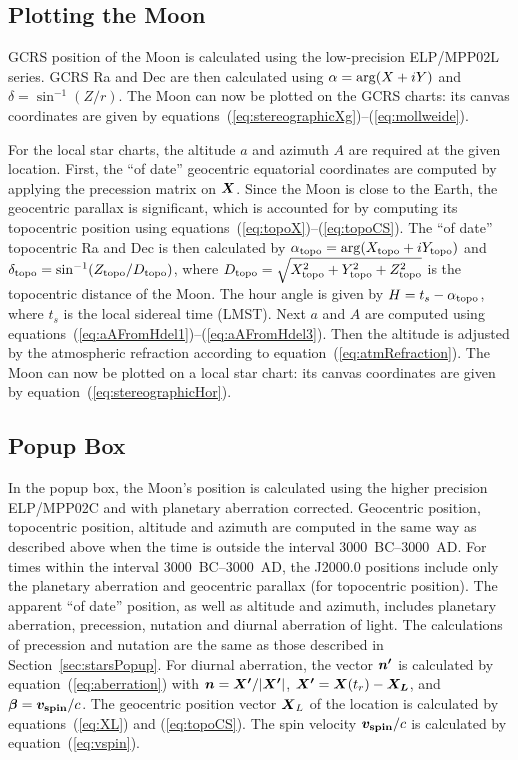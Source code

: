 \documentclass[12pt]{article}
\newcommand{\ve}[1]{\mbox{\boldmath $#1$}}
\begin{document}
\subsection{Plotting the Moon} 

GCRS position of the Moon is calculated using the low-precision ELP/MPP02L 
series. GCRS Ra and Dec are then calculated using $\alpha={\rm arg}(X+iY)$ 
and $\delta=\sin^{-1}(Z/r)$. The Moon can now be plotted 
on the GCRS charts: its canvas coordinates are given by 
equations~(\ref{eq:stereographicXg})--(\ref{eq:mollweide}).

For the local star charts, the altitude $a$
and azimuth $A$ are required at the given location. First, the ``of date'' geocentric equatorial
coordinates are computed by applying the precession matrix on $\ve{X}$. 
Since the Moon is close to the Earth, the geocentric parallax is significant, which 
is accounted for by computing its topocentric position using 
equations~(\ref{eq:topoX})--(\ref{eq:topoCS}). The ``of date'' topocentric Ra and Dec
is then calculated by $\alpha_{\rm topo} = {\rm arg}(X_{\rm topo}+iY_{\rm topo})$ and 
$\delta_{\rm topo}=\sin^{-1} (Z_{\rm topo}/D_{\rm topo})$, where 
$D_{\rm topo}=\sqrt{X_{\rm topo}^2 + Y_{\rm topo}^2 + Z_{\rm topo}^2}$ is 
the topocentric distance of the Moon.
The hour angle is given by $H=t_s-\alpha_{\rm topo}$, where $t_s$ is the local
sidereal time (LMST). Next $a$ and $A$ are computed using
equations~(\ref{eq:aAFromHdel1})--(\ref{eq:aAFromHdel3}). Then the altitude
is adjusted by the atmospheric refraction according to equation~(\ref{eq:atmRefraction}).
The Moon can now be plotted on a local star chart: its canvas coordinates are
given by equation~(\ref{eq:stereographicHor}).

\subsection{Popup Box}

In the popup box, the Moon's position is calculated using the higher precision 
ELP/MPP02C and with planetary aberration corrected. Geocentric position, topocentric 
position, altitude and azimuth are computed in the same way as described above when 
the time is outside the interval 3000~BC--3000~AD. For times within the interval 
3000~BC--3000~AD, the J2000.0 positions
include only the planetary aberration and geocentric parallax (for topocentric
position). The apparent ``of date'' position, as well as altitude and azimuth,
includes planetary aberration, precession, nutation and diurnal aberration of light. 
The calculations of precession and nutation are the same
as those described in Section~\ref{sec:starsPopup}. For diurnal aberration, 
the vector $\ve{n'}$ is calculated by
equation~(\ref{eq:aberration}) with $\ve{n}=\ve{X'}/|\ve{X'}|$, 
$\ve{X'}=\ve{X}(t_r)-\ve{X_L}$, and $\ve{\beta}=\ve{v_{\rm spin}}/c$. 
The geocentric position vector $\ve{X}_L$ of the location is calculated by
equations~(\ref{eq:XL}) and (\ref{eq:topoCS}). The spin velocity 
$\ve{v_{\rm spin}}/c$ is calculated by equation~(\ref{eq:vspin}).
\end{document}
